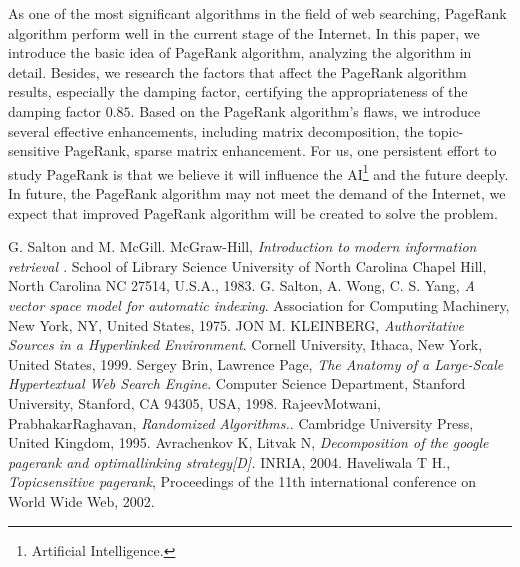 \documentclass[lettersize,journal,12pt,conference]{IEEEtran}
\begin{document}
As one of the most significant algorithms in the field of web searching, PageRank algorithm perform well in the current stage of the Internet. In this paper, we introduce the basic idea of PageRank algorithm, analyzing the algorithm in detail. Besides, we research the factors that affect the PageRank algorithm results, especially the damping factor, certifying the appropriateness of the damping factor $0.85$. Based on the PageRank algorithm's flaws, we introduce several effective enhancements, including matrix decomposition, the topic-sensitive PageRank, sparse matrix enhancement. For us, one persistent effort to study PageRank is that we believe it will influence the AI\footnote[1]{Artificial Intelligence.} and the future deeply. In future, the PageRank algorithm may not meet the demand of the Internet, we expect that improved PageRank algorithm will be created to solve the problem. 

\begin{thebibliography}{1}

	G. Salton and M. McGill. McGraw-Hill, {\it{Introduction to modern information retrieval }}. School of Library Science University of North Carolina Chapel Hill, North Carolina NC 27514, U.S.A., 1983. 
    G. Salton, A. Wong, C. S. Yang, {\it{A vector space model for automatic indexing}}. Association for Computing Machinery, New York, NY, United States, 1975.
	JON M. KLEINBERG, {\it{Authoritative Sources in a Hyperlinked Environment}}. Cornell University, Ithaca, New York, United States, 1999.
	Sergey Brin, Lawrence Page, {\it{The Anatomy of a Large-Scale Hypertextual Web
	Search Engine}}. Computer Science Department, Stanford University, Stanford, CA 94305, USA, 1998.
	RajeevMotwani, PrabhakarRaghavan, {\it{Randomized Algorithms.}}. Cambridge University Press, United Kingdom, 1995.
	Avrachenkov K, Litvak N, {\it{Decomposition of the google pagerank and optimallinking strategy[D].}} INRIA, 2004.
	Haveliwala T H., {\it{Topicsensitive pagerank}}, Proceedings of the 11th international conference on World Wide Web, 2002.

\end{thebibliography}
\end{document}
